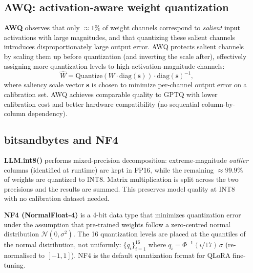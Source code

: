 \documentclass[11pt,a4paper]{article}
\begin{document}
	\subsection{AWQ: activation-aware weight quantization}

	\textbf{AWQ} \parencite{lin2023awq} observes that only $\approx 1\%$ of weight channels correspond to \emph{salient} input activations with large magnitudes, and that quantizing these salient channels introduces disproportionately large output error. AWQ protects salient channels by scaling them up before quantization (and inverting the scale after), effectively assigning more quantization levels to high-activation-magnitude channels:
	\begin{equation}
		\hat{W} = \mathrm{Quantize}(W \cdot \mathrm{diag}(\mathbf{s})) \cdot \mathrm{diag}(\mathbf{s})^{-1},
	\end{equation}
	where saliency scale vector $\mathbf{s}$ is chosen to minimize per-channel output error on a calibration set. AWQ achieves comparable quality to GPTQ with lower calibration cost and better hardware compatibility (no sequential column-by-column dependency).

	\subsection{bitsandbytes and NF4}

	\textbf{LLM.int8()} \parencite{dettmers2022llmint8} performs mixed-precision decomposition: extreme-magnitude \emph{outlier} columns (identified at runtime) are kept in FP16, while the remaining $\approx 99.9\%$ of weights are quantized to INT8. Matrix multiplication is split across the two precisions and the results are summed. This preserves model quality at INT8 with no calibration dataset needed.

	\textbf{NF4 (NormalFloat-4)} \parencite{dettmers2024} is a 4-bit data type that minimizes quantization error under the assumption that pre-trained weights follow a zero-centred normal distribution $\mathcal{N}(0, \sigma^2)$. The 16 quantization levels are placed at the quantiles of the normal distribution, not uniformly: $\{q_i\}_{i=1}^{16}$ where $q_i = \Phi^{-1}(i/17)\,\sigma$ (re-normalised to $[-1,1]$). NF4 is the default quantization format for QLoRA fine-tuning.
\end{document}
